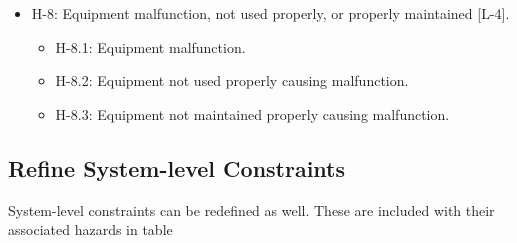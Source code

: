 \documentclass[../../main/main.tex]{subfiles}
\begin{document}
\begin{itemize}
\item H-8: Equipment malfunction, not used properly, or properly maintained [L-4].\\
\begin{itemize}
\item H-8.1: Equipment malfunction.
\item H-8.2: Equipment not used properly causing malfunction.
\item H-8.3: Equipment not maintained properly causing malfunction.
\end{itemize}


\end{itemize}

\subsection{Refine System-level Constraints}
System-level constraints can be redefined as well.  These are included with their associated hazards in table

\parskip=8pt
\end{document}
